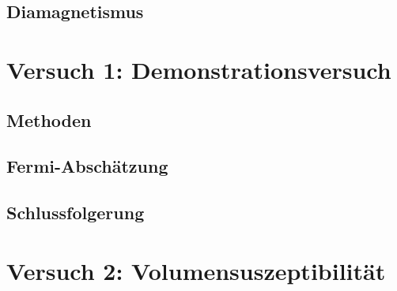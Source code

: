 \documentclass[11pt,a4paper,titlepage, ngerman]{article}
\begin{document}
			
		\subsection{Diamagnetismus}
		
			
			
	\section{Versuch 1: Demonstrationsversuch} 
		
		
		
		\subsection*{Methoden} 
		
		
					
		\subsection*{Fermi-Abschätzung}
			
			
			
		\subsection*{Schlussfolgerung}
						
			
			
	\section{Versuch 2: Volumensuszeptibilität}		
		
		
		
\end{document}
